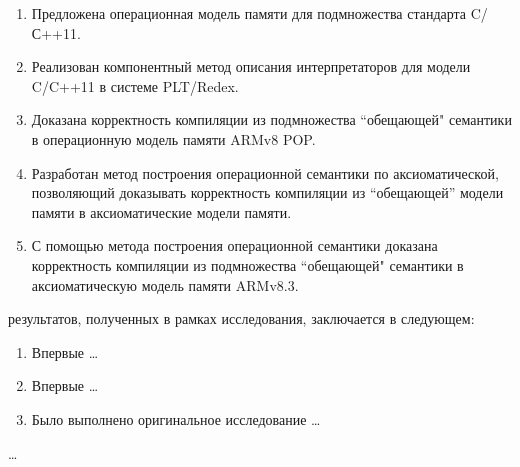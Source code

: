 {}
\begin{enumerate}
  \item Предложена операционная модель памяти для подмножества стандарта C/С++11.
  \item Реализован компонентный метод описания интерпретаторов для модели C/C++11 в системе PLT/Redex.
  \item Доказана корректность компиляции из подмножества ``обещающей" \; семантики в операционную модель памяти ARMv8 POP.
  \item Разработан метод построения операционной семантики по аксиоматической, позволяющий доказывать корректность
        компиляции из ``обещающей'' модели памяти в аксиоматические модели памяти.
  \item С помощью метода построения операционной семантики
        доказана корректность компиляции из подмножества ``обещающей" \; семантики в аксиоматическую модель памяти ARMv8.3.
\end{enumerate}

{\novelty} результатов, полученных в рамках исследования, заключается в следующем:
\begin{enumerate}
  \item Впервые \ldots
  \item Впервые \ldots
  \item Было выполнено оригинальное исследование \ldots
\end{enumerate}

{\influence} \ldots


  

